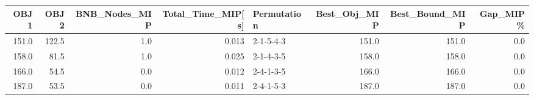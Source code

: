 \begin{tabular}{rrrrlrrr}
\toprule
  OBJ1 &   OBJ2 &  BNB\_Nodes\_MIP &  Total\_Time\_MIP[s] & Permutation &  Best\_Obj\_MIP &  Best\_Bound\_MIP &  Gap\_MIP\% \\
\midrule
 151.0 &  122.5 &            1.0 &              0.013 &   2-1-5-4-3 &         151.0 &           151.0 &       0.0 \\
 158.0 &   81.5 &            1.0 &              0.025 &   2-1-4-3-5 &         158.0 &           158.0 &       0.0 \\
 166.0 &   54.5 &            0.0 &              0.012 &   2-4-1-3-5 &         166.0 &           166.0 &       0.0 \\
 187.0 &   53.5 &            0.0 &              0.011 &   2-4-1-5-3 &         187.0 &           187.0 &       0.0 \\
\bottomrule
\end{tabular}

